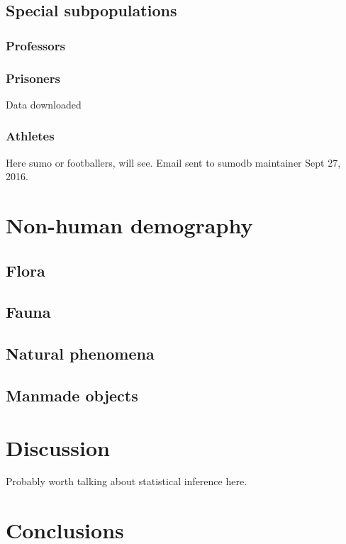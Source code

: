 \documentclass[11pt,oneside]{article} %
\begin{document}
	\subsection{Special subpopulations}
		\subsubsection{Professors}
		\subsubsection{Prisoners}
		Data downloaded
		\subsubsection{Athletes}
		Here sumo or footballers, will see. Email sent to sumodb maintainer Sept 27,
		2016.
\section{Non-human demography}	
	\subsection{Flora}
	\subsection{Fauna}
	\subsection{Natural phenomena}
	\subsection{Manmade objects}
	
\section{Discussion}

Probably worth talking about statistical inference here.

\section{Conclusions}





\cite{*}


\singlespacing

   
\end{document}
